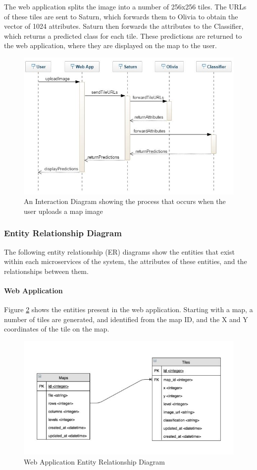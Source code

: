 The web application splits the image into a number of 256x256 tiles. The URLs of these tiles are sent to Saturn, which forwards them to Olivia to obtain the vector of 1024 attributes. Saturn then forwards the attributes to the Classifier, which returns a predicted class for each tile. These predictions are returned to the web application, where they are displayed on the map to the user. 
\begin{figure}[H]
    \centering
    \includegraphics[width=\textwidth]{figs/4/interaction_diagram}
    \caption{An Interaction Diagram showing the process that occurs when the user uploads a map image}
    \label{fig:interaction_diagram}
\end{figure}

\subsubsection{Entity Relationship Diagram}
The following entity relationship (ER) diagrams show the entities that exist within each microservices of the system, the attributes of these entities, and the relationships between them.
\paragraph{Web Application\\}
Figure \ref{fig:webapp_er} shows the entities present in the web application. Starting with a map, a number of tiles are generated, and identified from the map ID, and the X and Y coordinates of the tile on the map. 
\begin{figure}[H]
    \centering
    \includegraphics[width=\textwidth]{figs/4/webapp_er}
    \caption{Web Application Entity Relationship Diagram}
    \label{fig:webapp_er}
\end{figure}
